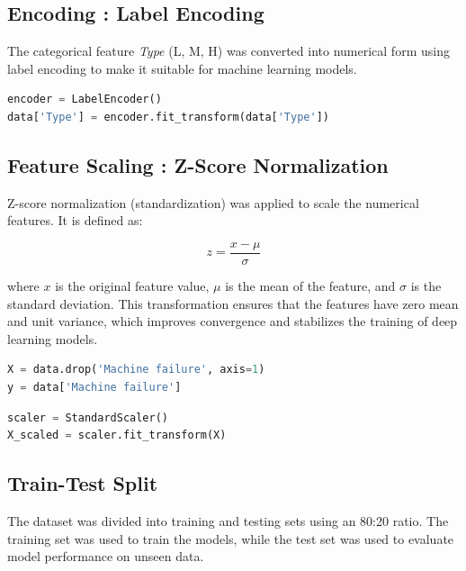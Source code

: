 \documentclass{ecsproject}     %
\begin{document}
\subsection{Encoding : Label Encoding}

The categorical feature \textit{Type} (L, M, H) was converted into numerical form using label encoding to make it suitable for machine learning models.

\begin{lstlisting}[language=Python, caption=Label Encoding]
encoder = LabelEncoder()
data['Type'] = encoder.fit_transform(data['Type'])
\end{lstlisting}

\subsection{Feature Scaling : Z-Score Normalization}

Z-score normalization (standardization) was applied to scale the numerical features. It is defined as:

\begin{equation}
z = \frac{x - \mu}{\sigma}
\end{equation}

where \(x\) is the original feature value, \(\mu\) is the mean of the feature, and \(\sigma\) is the standard deviation. This transformation ensures that the features have zero mean and unit variance, which improves convergence and stabilizes the training of deep learning models.

\begin{lstlisting}[language=Python, caption=Feature and Target Split]
X = data.drop('Machine failure', axis=1)
y = data['Machine failure']
\end{lstlisting}

\begin{lstlisting}[language=Python, caption=Z-score Normalization using StandardScaler]
scaler = StandardScaler()
X_scaled = scaler.fit_transform(X)
\end{lstlisting}

\subsection{Train-Test Split}

The dataset was divided into training and testing sets using an 80:20 ratio. The training set was used to train the models, while the test set was used to evaluate model performance on unseen data.
\end{document}
